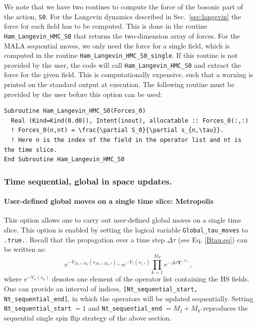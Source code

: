 We note that we have two routines to compute the force of the bosonic part of the action, \texttt{S0}.  For the  Langevin dynamics  described in Sec.~\ref{sec:langevin} the force for  each  field  has to be computed. This is done in the routine \texttt{Ham\_Langevin\_HMC\_S0}  that returns the two-dimension array 
of forces. For the MALA sequential moves, we only need the force for a single field, which is computed in the routine \texttt{Ham\_Langevin\_HMC\_S0\_single}.   If this routine is not provided by the user, the code will call \texttt{Ham\_Langevin\_HMC\_S0} and extract the force for the given field.  This is computationally expensive,  such that a warning is printed on the standard output at execution. The following routine must be provided by the user before this option can be used: 
\begin{lstlisting}[style=fortran]
Subroutine Ham_Langevin_HMC_S0(Forces_0)
  Real (Kind=Kind(0.d0)), Intent(inout), allocatable :: Forces_0(:,:)
  ! Forces_0(n,nt) = \frac{\partial S_0}{\partial s_{n,\tau}}.  
  ! Here n is the index of the field in the operator list and nt is the time slice.	
End Subroutine Ham_Langevin_HMC_S0
\end{lstlisting}



\subsubsection{Time sequential, global in space updates.}
\paragraph{User-defined global moves on a single time slice: Metropolis}
\label{sec:global_space}
This option allows one to carry out  user-defined global moves on a single time slice.  This option is enabled by setting the logical variable  \texttt{Global\_tau\_moves} to \texttt{.true.}.  Recall that the propagation over a time step $\Delta \tau$   (see Eq. \ref{Btau.eq}) can be  written as: 
\begin{equation}
	e^{-V_{M_I+M_V}(s_{M_I+M_V,\tau})}  \cdots e^{-V_{1}(s_{1,\tau})}  \prod_{k=1}^{M_T}   e^{-\Delta \tau {\bm T}^{(k)}},
\end{equation}
where $e^{-V_{n}(s_{n})}$ denotes one element of the  operator list  containing the HS fields.  One can provide  an interval of indices, 
\texttt{[Nt\_sequential\_start, Nt\_sequential\_end]},  in which the operators will be updated  sequentially. Setting \texttt{Nt\_sequential\_start}$\; = 1$ and \texttt{Nt\_sequential\_end}$\; = M_I+M_V$  reproduces the  sequential single spin flip strategy of the above section.

